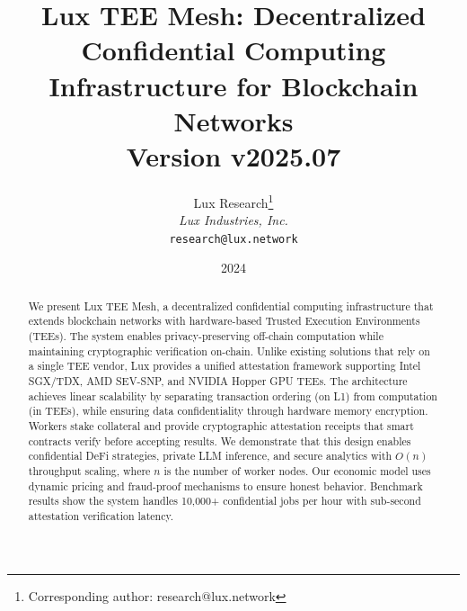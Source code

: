 \documentclass[11pt,letterpaper]{article}
\title{\textbf{Lux TEE Mesh: Decentralized Confidential Computing Infrastructure for Blockchain Networks}\\
\large Version v2025.07}
\author{
Lux Research\thanks{Corresponding author: research@lux.network}\\
\textit{Lux Industries, Inc.}\\
\texttt{research@lux.network}
}
\date{2024}
\begin{document}
\luxcoverpage

\begin{abstract}
We present Lux TEE Mesh, a decentralized confidential computing infrastructure that extends blockchain networks with hardware-based Trusted Execution Environments (TEEs). The system enables privacy-preserving off-chain computation while maintaining cryptographic verification on-chain. Unlike existing solutions that rely on a single TEE vendor, Lux provides a unified attestation framework supporting Intel SGX/TDX, AMD SEV-SNP, and NVIDIA Hopper GPU TEEs. The architecture achieves linear scalability by separating transaction ordering (on L1) from computation (in TEEs), while ensuring data confidentiality through hardware memory encryption. Workers stake collateral and provide cryptographic attestation receipts that smart contracts verify before accepting results. We demonstrate that this design enables confidential DeFi strategies, private LLM inference, and secure analytics with $O(n)$ throughput scaling, where $n$ is the number of worker nodes. Our economic model uses dynamic pricing and fraud-proof mechanisms to ensure honest behavior. Benchmark results show the system handles 10,000+ confidential jobs per hour with sub-second attestation verification latency.
\end{abstract}
















\end{document}
